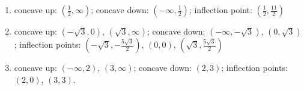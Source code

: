 \begin{enumerate}
\setcounter{enumi}{\value{HW}}


\item  concave up: $\left(\frac{1}{2}, \infty\right)$;  concave down: $\left( - \infty, \frac{1}{2} \right)$; inflection point:  $\left(\frac{1}{2}, \frac{11}{2}\right)$

\smallskip

\item concave up:  $\left( -\sqrt{3}, 0 \right)$, $\left( \sqrt{3}, \infty \right)$;  concave down:    $\left(- \infty,  -\sqrt{3} \right)$, $\left(0,  \sqrt{3} \right)$;  inflection points:  $\left( -\sqrt{3}, -\frac{5 \sqrt{3}}{2} \right)$, $(0,0)$, $\left( \sqrt{3}, \frac{5 \sqrt{3}}{2} \right)$
\smallskip

\item  concave up:  $(-\infty, 2)$, $(3, \infty)$;  concave down:  $(2,3)$;  inflection points: $(2,0)$, $(3, 3)$. 

\smallskip

\setcounter{HW}{\value{enumi}}
\end{enumerate}

